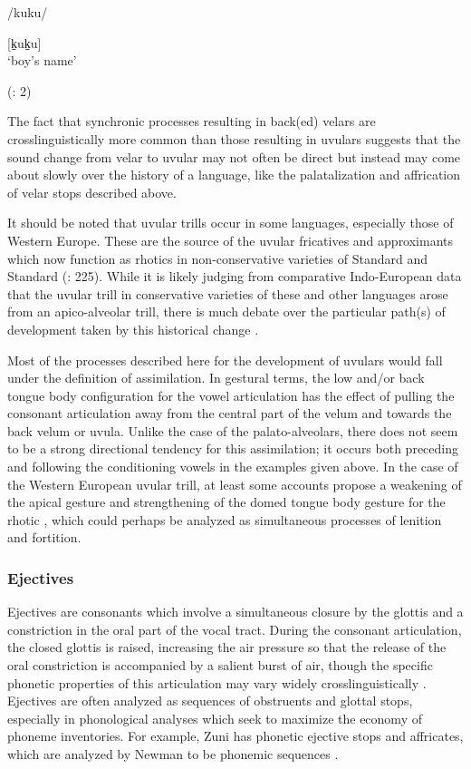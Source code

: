 \ea\label{ex:4.41}

/kuku/

[k̠uk̠u]\\
\glt ‘boy’s name’

(\citealt{BlackBlack1971}: 2)
\z

  The fact that synchronic processes resulting in back(ed) velars are crosslinguistically more common than those resulting in uvulars suggests that the sound change from velar to uvular may not often be direct but instead may come about slowly over the history of a language, like the palatalization and affrication of velar stops described above.

  It should be noted that uvular trills occur in some languages, especially those of Western Europe. These are the source of the uvular fricatives and approximants which now function as rhotics in non-conservative varieties of Standard  and Standard  (\citealt{LadefogedMaddieson1996}: 225). While it is likely judging from comparative Indo-European data that the uvular trill in conservative varieties of these and other languages arose from an apico-alveolar trill, there is much debate over the particular path(s) of development taken by this historical change \citep{Schiller1999}.

  Most of the processes described here for the development of uvulars would fall under the definition of assimilation. In gestural terms, the low and/or back tongue body configuration for the vowel articulation has the effect of pulling the consonant articulation away from the central part of the velum and towards the back velum or uvula. Unlike the case of the palato-alveolars, there does not seem to be a strong directional tendency for this assimilation; it occurs both preceding and following the conditioning vowels in the examples given above. In the case of the Western European uvular trill, at least some accounts propose a weakening of the apical gesture and strengthening of the domed tongue body gesture for the rhotic \citep{Schiller1999}, which could perhaps be analyzed as simultaneous processes of lenition and fortition.

\subsubsection{Ejectives}\label{sec:4.5.2.3}

  Ejectives are consonants which involve a simultaneous closure by the glottis and a constriction in the oral part of the vocal tract. During the consonant articulation, the closed glottis is raised, increasing the air pressure so that the release of the oral constriction is accompanied by a salient burst of air, though the specific phonetic properties of this articulation may vary widely crosslinguistically \citep{Lindau1984}. Ejectives are often analyzed as sequences of obstruents and glottal stops, especially in phonological analyses which seek to maximize the economy of phoneme inventories. For example, Zuni has phonetic ejective stops and affricates, which are analyzed by Newman to be phonemic sequences .

